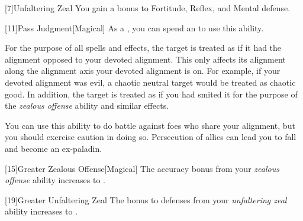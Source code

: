         [7]{Unfaltering Zeal}
        You gain a  bonus to Fortitude, Reflex, and Mental defense.

        [11]{Pass Judgment}[Magical] As a , you can spend an  to use this ability.
        \begin{ability}
            \begin{spelltargetinginfo}
            \end{spelltargetinginfo}
            \begin{spelleffects}
                \spelleffect For the purpose of all spells and effects, the target is treated as if it had the alignment opposed to your devoted alignment.
                This only affects its alignment along the alignment axis your devoted alignment is on.
                For example, if your devoted alignment was evil, a chaotic neutral target would be treated as chaotic good.
                In addition, the target is treated as if you had smited it for the purpose of the \textit{zealous offense} ability and similar effects.

                You can use this ability to do battle against foes who share your alignment, but you should exercise caution in doing so.
                Persecution of allies can lead you to fall and become an ex-paladin.
            \end{spelleffects}
        \end{ability}

        [15]{Greater Zealous Offense}[Magical]
        The accuracy bonus from your \textit{zealous offense} ability increases to .

        [19]{Greater Unfaltering Zeal}
        The bonus to defenses from your \textit{unfaltering zeal} ability increases to .


